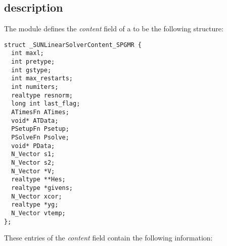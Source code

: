 \subsection{{\sunlinsolspgmr} description}\label{ss:sunlinsol_spgmr_description}


The {\sunlinsolspgmr} module defines the {\em content} field of a
 to be the following structure:
\begin{verbatim} 
struct _SUNLinearSolverContent_SPGMR {
  int maxl;
  int pretype;
  int gstype;
  int max_restarts;
  int numiters;
  realtype resnorm;
  long int last_flag;
  ATimesFn ATimes;
  void* ATData;
  PSetupFn Psetup;
  PSolveFn Psolve;
  void* PData;
  N_Vector s1;
  N_Vector s2;
  N_Vector *V;
  realtype **Hes;
  realtype *givens;
  N_Vector xcor;
  realtype *yg;
  N_Vector vtemp;
};
\end{verbatim}
These entries of the \emph{content} field contain the following
information:
